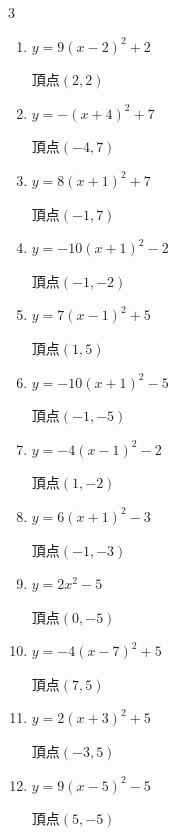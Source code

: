 \begin{multicols}{3}
\begin{enumerate}
  \item $\displaystyle y=9\left( x-2\right)^{2}+2$

        $\displaystyle 頂点\left( 2 , 2 \right)$

  \item $\displaystyle y=-\left( x+4\right)^{2}+7$

        $\displaystyle 頂点\left( -4 , 7 \right)$

  \item $\displaystyle y=8\left( x+1\right)^{2}+7$

        $\displaystyle 頂点\left( -1 , 7 \right)$

  \item $\displaystyle y=-10\left( x+1\right)^{2}-2$

        $\displaystyle 頂点\left( -1 , -2 \right)$

  \item $\displaystyle y=7\left( x-1\right)^{2}+5$

        $\displaystyle 頂点\left( 1 , 5 \right)$

  \item $\displaystyle y=-10\left( x+1\right)^{2}-5$

        $\displaystyle 頂点\left( -1 , -5 \right)$

  \item $\displaystyle y=-4\left( x-1\right)^{2}-2$

        $\displaystyle 頂点\left( 1 , -2 \right)$

  \item $\displaystyle y=6\left( x+1\right)^{2}-3$

        $\displaystyle 頂点\left( -1 , -3 \right)$

  \item $\displaystyle y=2x^{2}-5$

        $\displaystyle 頂点\left( 0 , -5 \right)$

  \item $\displaystyle y=-4\left( x-7\right)^{2}+5$

        $\displaystyle 頂点\left( 7 , 5 \right)$

  \item $\displaystyle y=2\left( x+3\right)^{2}+5$

        $\displaystyle 頂点\left( -3 , 5 \right)$

  \item $\displaystyle y=9\left( x-5\right)^{2}-5$

        $\displaystyle 頂点\left( 5 , -5 \right)$


\end{enumerate}
\end{multicols}
